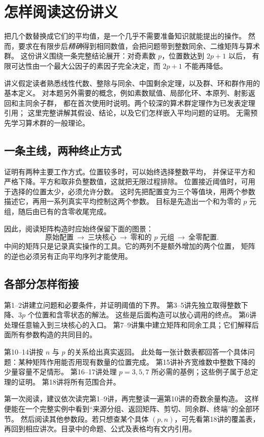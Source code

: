 
\chapter*{怎样阅读这份讲义}
把几个数替换成它们的平均值，是一个几乎不需要准备知识就能提出的操作。
然而，要求在有限步后\emph{精确}得到相同数值，会把问题带到整数同余、二维矩阵与算术群。
这份讲义围绕一条完整结论展开：对奇素数 $p$，位置数达到 $2p+1$ 以后，
有限可达性由一个最大公因子的素因子完全决定，而 $2p+1$ 不能再降低。

讲义假定读者熟悉线性代数、整除与同余、中国剩余定理，以及群、环和群作用的基本定义。
对本题另外需要的概念，例如素数赋值、局部化环、本原列、射影返回和主同余子群，
都在首次使用时说明。两个较深的算术群定理作为已发表定理引用；
这里完整讲解其假设、结论，以及它们怎样嵌入平均问题的证明。
无需预先学习算术群的一般理论。

\section*{一条主线，两种终止方式}
证明有两种主要工作方式。位置较多时，可以始终选择整数平均，
并保证平方和严格下降。平方和取非负整数值，这就把无限过程排除。
位置接近阈值时，可用于选择的位置太少，必须允许分数。
这时先把配置变为三个等值块，用两个参数描述它，再用一系列真实平均控制这两个参数。
目标是先造出一个和为零的 $p$ 元组，随后由已有的含零收尾完成。

因此，阅读矩阵构造时应始终保留下面的图景：
\[
\text{原始配置}\ \longrightarrow\ \text{三块核心}
\ \longrightarrow\ \text{零和的 }p\text{ 元组}
\ \longrightarrow\ \text{全零配置}.
\]
中间的矩阵只是记录真实操作的工具。它的两列不是额外增加的两个位置，
矩阵的逆也必须另有正向平均序列才能使用。

\section*{各部分怎样衔接}
第1--2讲建立问题和必要条件，并证明阈值的下界。
第3--5讲先独立取得整数下降、$3p$ 个位置和含零状态的解法。
这些是后面构造可以放心调用的终点。
第6讲处理任意输入到三块核心的入口。
第7--9讲集中建立矩阵和同余工具；它们解释后面所有参数构造的共同目的。

第10--14讲按 $n$ 与 $p$ 的关系给出真实返回。
此处每一张计数表都回答一个具体问题：某种矩阵作用能否用现有数量的位置完成。
第15讲补齐宽维数中整数下降的少量容量不足情形。
第16--17讲处理 $p=3,5,7$ 所必需的基例；这些例子属于总定理的证明。
第18讲将所有范围合并。

第一次阅读，建议依次读完第1--9讲，再完整读一遍第10讲的奇数余量构造。
这样便能在一个完整实例中看到“来源分组、返回矩阵、剪切、同余群、终端”的全部环节。
然后阅读其他参数段。若只想查某个具体 $(p,n)$，可先看第18讲的覆盖表，
再回到相应讲次。目录中的命题、公式及表格均有文内引用。

